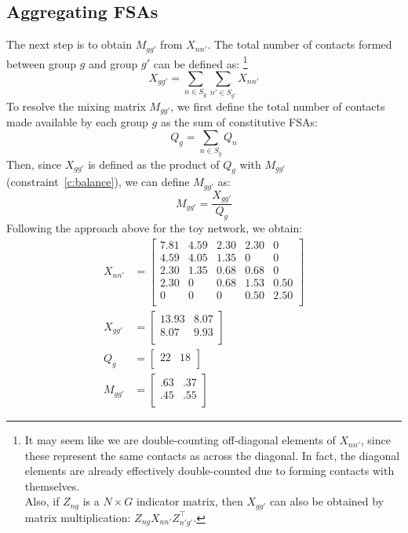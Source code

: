 \documentclass{article}
\begin{document}
  \subsection{Aggregating FSAs}
  The next step is to obtain $M_{gg'}$ from $X_{nn'}$.
  The total number of contacts formed between group $g$ and group $g'$ can be defined as:%
  \footnote{It may seem like we are double-counting off-diagonal elements of $X_{nn'}$,
    since these represent the same contacts as across the diagonal.
    In fact, the diagonal elements are already effectively double-counted
    due to forming contacts with themselves.\\[1ex]
    Also, if $Z_{ng}$ is a $N \times G$ indicator matrix,
    then $X_{gg'}$ can also be obtained by matrix multiplication: $Z_{ng} X_{nn'} Z_{n'g'}^\intercal$.}
  \begin{equation}
    X_{gg'} = \sum_{n \in S_g} \sum_{n' \in S_{g'}} X_{nn'}
  \end{equation}
  To resolve the mixing matrix $M_{gg'}$, we first define
  the total number of contacts made available by each group $g$
  as the sum of constitutive FSAs:
  \begin{equation}
    Q_g = \sum_{n \in S_g} Q_n
  \end{equation}
  Then, since $X_{gg'}$ is defined as the product of $Q_g$ with $M_{gg'}$ (constraint~\ref{c:balance}),
  we can define $M_{gg'}$ as:
  \begin{equation}
    M_{gg'} = \frac{X_{gg'}}{Q_g}
  \end{equation}
  Following the approach above for the toy network, we obtain:
  \begin{subequations}
  \begin{align}
    X_{nn'} &=
    \left[\begin{matrix}
      7.81 & 4.59 & 2.30 & 2.30 & 0    \\
      4.59 & 4.05 & 1.35 & 0    & 0    \\
      2.30 & 1.35 & 0.68 & 0.68 & 0    \\
      2.30 & 0    & 0.68 & 1.53 & 0.50 \\
      0    & 0    & 0    & 0.50 & 2.50 \\
    \end{matrix}\right]
    \\ X_{gg'} &=
    \left[\begin{matrix}
     13.93 & 8.07 \\
      8.07 & 9.93 \\
    \end{matrix}\right]
    \\ Q_{g} &=
    \left[\begin{matrix}
    22 & 18 \\
    \end{matrix}\right]
    \\ M_{gg'} &=
    \left[\begin{matrix}
      .63 & .37 \\
      .45 & .55 \\
    \end{matrix}\right]
  \end{align}
  \end{subequations}
\end{document}
